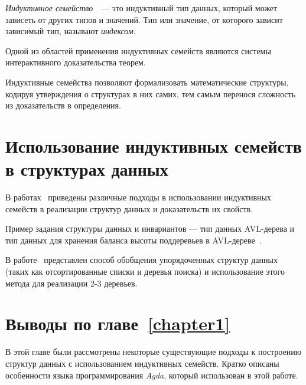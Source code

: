 \begin{definition}
\emph{Индуктивное семейство}~\cite{DybjerIndFam, RefiningIT}~— это индуктивный тип данных,
который может зависеть от других типов и значений.
Тип или значение, от которого зависит зависимый тип, называют \emph{индексом}.
\end{definition}

Одной из областей применения индуктивных семейств являются системы интерактивного
доказательства теорем.

Индуктивные семейства позволяют формализовать математические структуры,
кодируя утверждения о структурах в них самих,
тем самым перенося сложность из доказательств в определения.

\section{Использование индуктивных семейств в структурах данных}
В работах~\cite{HongweiXi, McBridePivotal} приведены различные подходы
в использовании индуктивных семейств в реализации структур данных
и доказательств их свойств.

Пример задания структуры данных и инвариантов — тип данных AVL-дерева
и тип данных для хранения баланса высоты поддеревьев в AVL-дереве~\cite{AVLTree}.



В работе~\cite{McBridePivotal} представлен способ обобщения
упорядоченных структур данных
(таких как отсортированные списки и деревья поиска)
и использование этого метода для реализации 2-3 деревьев.

\section{Выводы по главе~\ref{chapter1}}

В этой главе были рассмотрены некоторые существующие подходы к построению структур данных
с использованием индуктивных семейств.
Кратко описаны особенности языка программирования \textit{Agda},
который использован в этой работе.
